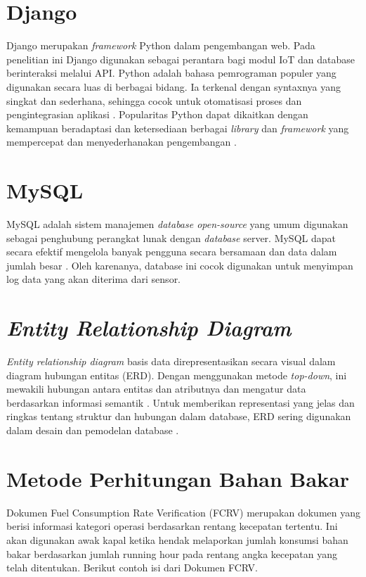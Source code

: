\section{Django}

\noindent Django merupakan \textit{framework} Python dalam pengembangan web. Pada penelitian ini Django digunakan sebagai perantara bagi modul IoT dan database berinteraksi melalui API. Python adalah bahasa pemrograman populer yang digunakan secara luas di berbagai bidang. Ia terkenal dengan syntaxnya yang singkat dan sederhana, sehingga cocok untuk otomatisasi proses dan pengintegrasian aplikasi \parencite{article:buhler}. Popularitas Python dapat dikaitkan dengan kemampuan beradaptasi dan ketersediaan berbagai \textit{library} dan \textit{framework} yang mempercepat dan menyederhanakan pengembangan \parencite{article:malloy}.

\section{MySQL}

\noindent MySQL adalah sistem manajemen \textit{database open-source} yang umum digunakan sebagai penghubung perangkat lunak dengan \textit{database} server. MySQL dapat secara efektif mengelola banyak pengguna secara bersamaan dan data dalam jumlah besar \parencite{article:gomez}. Oleh karenanya, database ini cocok digunakan untuk menyimpan log data yang akan diterima dari sensor.

\section{\textit{Entity Relationship Diagram}}

\noindent \textit{Entity relationship diagram} basis data direpresentasikan secara visual dalam diagram hubungan entitas (ERD). Dengan menggunakan metode \textit{top-down}, ini mewakili hubungan antara entitas dan atributnya dan mengatur data berdasarkan informasi semantik \parencite{article:chen}. Untuk memberikan representasi yang jelas dan ringkas tentang struktur dan hubungan dalam database, ERD sering digunakan dalam desain dan pemodelan database \parencite{article:supriyadi}.

\section{Metode Perhitungan Bahan Bakar}

\noindent Dokumen Fuel Consumption Rate Verification (FCRV) merupakan dokumen yang berisi informasi kategori operasi berdasarkan rentang kecepatan tertentu. Ini akan digunakan awak kapal ketika hendak melaporkan jumlah konsumsi bahan bakar berdasarkan jumlah running hour pada rentang angka kecepatan yang telah ditentukan. Berikut contoh isi dari Dokumen FCRV.

